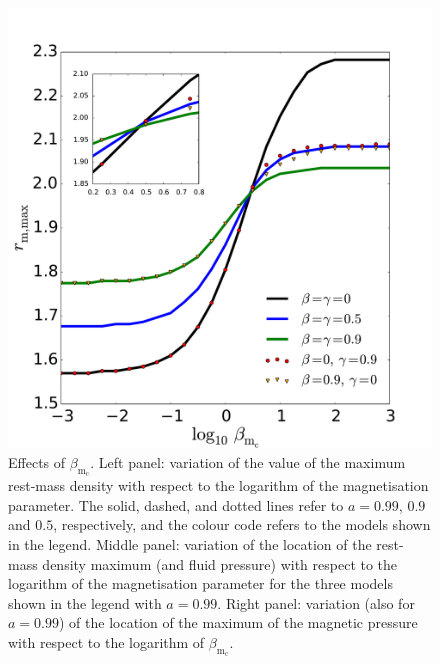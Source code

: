 \documentclass[referee]{aa}
\begin{document}
\begin{figure}
\hspace{-0.2cm}
\includegraphics[scale=0.14]{figures/fig6c.pdf}
\caption{Effects of $\beta_{\mathrm{m}_{\mathrm{c}}}$. Left panel: variation of the value of the maximum rest-mass density with respect to the logarithm of the magnetisation parameter. The solid, dashed, and dotted lines refer to $a = 0.99$, $0.9$ and $0.5$, respectively, and the colour code refers to the models shown in the legend. Middle panel: variation of the location of the rest-mass density maximum (and fluid pressure) with respect to the logarithm of the magnetisation parameter for the three models shown in the legend with $a = 0.99$. Right panel: variation (also for $a = 0.99$) of the location of the maximum of the magnetic pressure with respect to the logarithm of $\beta_{\mathrm{m}_{\mathrm{c}}}$.}
           \label{max-vs-magnetisation}%
 \end{figure}
 
\end{document}
